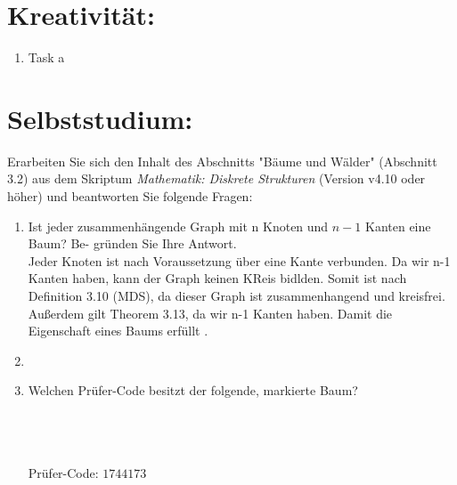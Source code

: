     \section*{Kreativität:}
    \begin{enumerate}[label=(\alph*)]
        \item Task a
    \end{enumerate}
    \section*{Selbststudium:}
        Erarbeiten Sie sich den Inhalt des Abschnitts "Bäume und Wälder" (Abschnitt 3.2) aus dem
        Skriptum \textit{Mathematik: Diskrete Strukturen} (Version v4.10 oder höher) und beantworten Sie
        folgende Fragen:
    \begin{enumerate}[label=(\alph*)]
        \item Ist jeder zusammenhängende Graph mit n Knoten und $n - 1$ Kanten eine Baum? Be-
        gründen Sie Ihre Antwort.\\
        Jeder Knoten ist nach Voraussetzung über eine Kante verbunden. Da wir n-1 Kanten haben, kann der Graph keinen KReis bidlden. Somit ist nach Definition 3.10 (MDS),
        da dieser Graph ist zusammenhangend und kreisfrei. %
        \\ Außerdem gilt Theorem 3.13, da wir n-1 Kanten haben. Damit die Eigenschaft eines Baums erfüllt .

        \item %

        \item Welchen Prüfer-Code besitzt der folgende, markierte Baum?\\\\
        \\\\
        Prüfer-Code: $1744173$


\end{enumerate}
